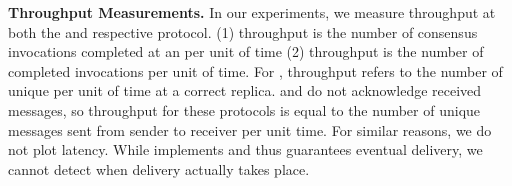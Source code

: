 {\bf Throughput Measurements.}
In our experiments, we measure throughput at both the  and respective \CCC{} protocol.
(1) \RSM{} throughput is the number of consensus invocations completed at an \RSM{} per unit of time
(2) \CCC{} throughput is the number of completed \CCC{} invocations per unit of time.
For \Scrooge{}, \CCC{} throughput refers to the number of unique  per unit of time at a correct replica.
\ATA{} and \OTO{} do not acknowledge received messages, 
so \CCC{} throughput for these protocols is equal to the number of unique messages sent from sender \RSM{} to receiver \RSM{} per unit time.
For similar reasons, we do not plot latency. While \ATA{} implements \CCC{} and thus guarantees eventual delivery, we cannot detect when delivery actually takes place. 
%

